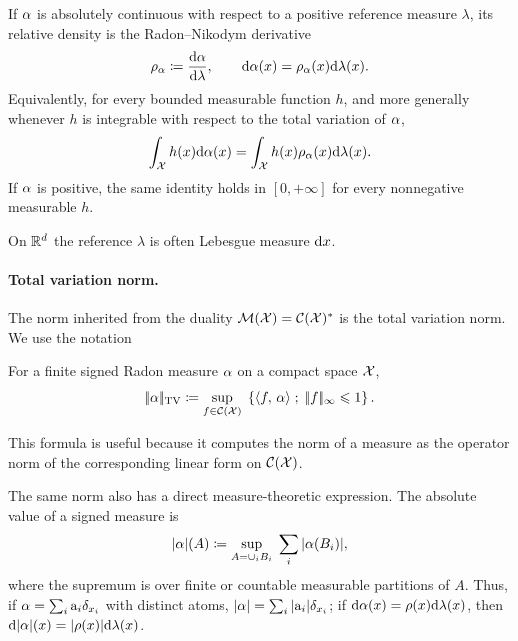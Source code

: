 \begin{defn}\label{def-relative-density}
	If $\alpha$ is absolutely continuous with respect to a positive reference measure $\lambda$, its relative density is the Radon--Nikodym derivative
	\[
		\rho_{\alpha}\coloneqq\frac{\mathrm{d}\alpha}{\mathrm{d}\lambda},
		\qquad
		\mathrm{d}\alpha(x)=\rho_{\alpha}(x)\mathrm{d}\lambda(x).
	\]
	Equivalently, for every bounded measurable function $h$, and more generally whenever $h$ is integrable with respect to the total variation of $\alpha$,
	\[
		\int_{\mathcal{X}} h(x) \mathrm{d}\alpha(x) = \int_{\mathcal{X}} h(x) \rho_{\alpha}(x) \mathrm{d}\lambda(x).
	\]
	If $\alpha$ is positive, the same identity holds in $[0,+\infty]$ for every nonnegative measurable $h$.
\end{defn}
On $\mathbb{R}^d$ the reference $\lambda$ is often Lebesgue measure $\mathrm{d} x$.

\paragraph{Total variation norm.}

The norm inherited from the duality $\mathcal{M}(\mathcal{X})=\mathcal{C}(\mathcal{X})^*$ is the total variation norm. We use the notation
\begin{defn}\label{defn-total-variation}
	For a finite signed Radon measure $\alpha$ on a compact space $\mathcal{X}$,
	\[
		|\!| \alpha |\!|_{\operatorname{TV}}
		\coloneqq
		\underset{f \in \mathcal{C}(\mathcal{X})}{\sup}\; \left\{ \langle f,\,\alpha\rangle \;;\; |\!| f |\!|_\infty \leqslant 1 \right\}.
	\]
\end{defn}
This formula is useful because it computes the norm of a measure as the operator norm of the corresponding linear form on $\mathcal{C}(\mathcal{X})$.

The same norm also has a direct measure-theoretic expression. The absolute value of a signed measure is
\[
	|\alpha|(A)
	\coloneqq
	\underset{A=\cup_i B_i}{\sup}\; \sum_i |\alpha(B_i)|,
\]
where the supremum is over finite or countable measurable partitions of $A$. Thus, if $\alpha=\sum_i \mathrm{a}_i \delta_{x_i}$ with distinct atoms, $|\alpha|=\sum_i |\mathrm{a}_i|\delta_{x_i}$; if $\mathrm{d}\alpha(x)=\rho(x)\mathrm{d}\lambda(x)$, then $\mathrm{d}|\alpha|(x)=|\rho(x)|\mathrm{d}\lambda(x)$.

